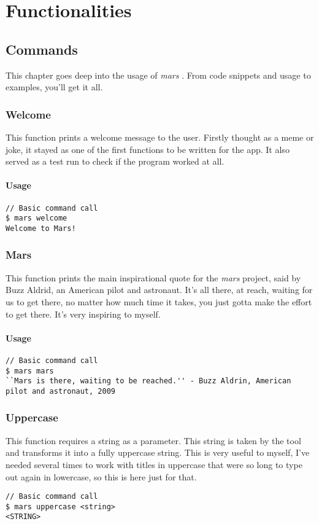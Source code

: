 \documentclass{report}
\begin{document}
\chapter{Functionalities}
\section{Commands}
This chapter goes deep into the usage of \emph{mars} \cite{fernandezMariolfhMars2025}.  From code snippets and usage to examples, you'll get it all. 

\subsection{Welcome}
This function prints a welcome message to the user. Firstly thought as a meme or joke, it stayed as one of the first functions to be written for the app. It also served as a test run to check if the program worked at all.
\subsubsection{Usage}
\begin{lstlisting}
// Basic command call
$ mars welcome
Welcome to Mars!
\end{lstlisting}

\subsection{Mars}
This function prints the main inspirational quote for the \emph{mars} project, said by Buzz Aldrid, an American pilot and astronaut. It's all there, at reach, waiting for us to get there, no matter how much time it takes, you just gotta make the effort to get there. It's very inspiring to myself.
\subsubsection{Usage}
\begin{lstlisting}
// Basic command call
$ mars mars
``Mars is there, waiting to be reached.'' - Buzz Aldrin, American pilot and astronaut, 2009
\end{lstlisting}

\subsection{Uppercase}
This function requires a string as a parameter. This string is taken by the tool and transforms it into a fully uppercase string. This is very useful to myself, I've needed several times to work with titles in uppercase that were so long to type out again in lowercase, so this is here just for that.
\begin{lstlisting}
// Basic command call
$ mars uppercase <string>
<STRING>
\end{lstlisting}
\end{document}
